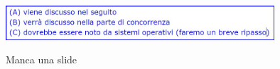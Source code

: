 \begin{center}
    \includegraphics[width=0.75\textwidth]{img/dacanc1.jpg}
\end{center}

Manca una slide


